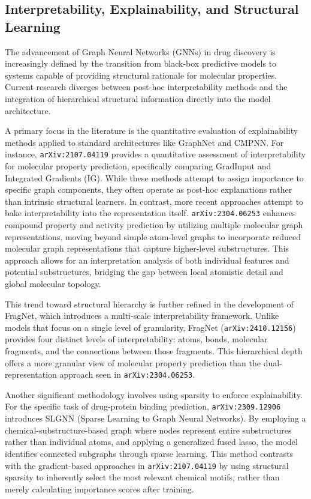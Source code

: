 \documentclass[11pt]{article}
\begin{document}
\subsection{Interpretability, Explainability, and Structural Learning}

The advancement of Graph Neural Networks (GNNs) in drug discovery is increasingly defined by the transition from black-box predictive models to systems capable of providing structural rationale for molecular properties. Current research diverges between post-hoc interpretability methods and the integration of hierarchical structural information directly into the model architecture.

A primary focus in the literature is the quantitative evaluation of explainability methods applied to standard architectures like GraphNet and CMPNN. For instance, \texttt{arXiv:2107.04119} provides a quantitative assessment of interpretability for molecular property prediction, specifically comparing GradInput and Integrated Gradients (IG). While these methods attempt to assign importance to specific graph components, they often operate as post-hoc explanations rather than intrinsic structural learners. In contrast, more recent approaches attempt to bake interpretability into the representation itself. \texttt{arXiv:2304.06253} enhances compound property and activity prediction by utilizing multiple molecular graph representations, moving beyond simple atom-level graphs to incorporate reduced molecular graph representations that capture higher-level substructures. This approach allows for an interpretation analysis of both individual features and potential substructures, bridging the gap between local atomistic detail and global molecular topology.

This trend toward structural hierarchy is further refined in the development of FragNet, which introduces a multi-scale interpretability framework. Unlike models that focus on a single level of granularity, FragNet (\texttt{arXiv:2410.12156}) provides four distinct levels of interpretability: atoms, bonds, molecular fragments, and the connections between those fragments. This hierarchical depth offers a more granular view of molecular property prediction than the dual-representation approach seen in \texttt{arXiv:2304.06253}.

Another significant methodology involves using sparsity to enforce explainability. For the specific task of drug-protein binding prediction, \texttt{arXiv:2309.12906} introduces SLGNN (Sparse Learning to Graph Neural Networks). By employing a chemical-substructure-based graph where nodes represent entire substructures rather than individual atoms, and applying a generalized fused lasso, the model identifies connected subgraphs through sparse learning. This method contrasts with the gradient-based approaches in \texttt{arXiv:2107.04119} by using structural sparsity to inherently select the most relevant chemical motifs, rather than merely calculating importance scores after training.
\end{document}
